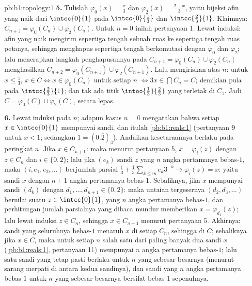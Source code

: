 \begin{solution}{pb:b1:topology:1}
\textbf{5.} Tulislah $\varphi_0(x) = \frac x3$ dan $\varphi_2(x) =
\frac{2 + x}{3}$, yaitu bijeksi afin yang naik dari $\intcc{0}{1}$
pada $\intcc{0}{\frac13}$ dan $\intcc{\frac23}{1}$. Klaimnya:
$C_{n+1} = \varphi_0(C_n) \cup \varphi_2(C_n)$. Untuk $n = 0$ inilah
pertanyaan 1. Lewat induksi:  afin yang naik mengirim
sepertiga tengah sebuah ruas ke sepertiga tengah ruas
petanya, sehingga menghapus sepertiga tengah berkomutasi dengan $\varphi_0$ dan
$\varphi_2$; lalu menerapkan langkah penghapusannya pada $C_{n+1} =
\varphi_0(C_n) \cup \varphi_2(C_n)$ menghasilkan $C_{n+2} =
\varphi_0(C_{n+1}) \cup \varphi_2(C_{n+1})$. Lalu mengiriskan atas
$n$: untuk $x \leq \frac13$, $x \in C \iff x \in \varphi_0(C_n)$
untuk setiap $n$ $\iff 3x \in \bigcap C_n = C$; demikian pula pada
$\intcc{\frac23}{1}$; dan tak ada titik $\intoo{\frac13}{\frac23}$ yang
terletak di $C_1$. Jadi $C = \varphi_0(C) \cup \varphi_2(C)$,
secara lepas.

\textbf{6.} Lewat induksi pada $n$; adapun kasus $n = 0$ mengatakan bahwa setiap $x \in
\intcc{0}{1}$ mempunyai sandi, dan itulah \cref{pb:b1:reals:1}
(pertanyaan 9 untuk $x < 1$; sedangkan $1 = (0.\overline 2)_3$). Andaikan
kesetaraannya berlaku pada peringkat $n$. Jika $x \in C_{n+1}$: maka menurut pertanyaan 5, $x =
\varphi_i(z)$ dengan $z \in C_n$ dan $i \in \{0, 2\}$; lalu jika $(e_k)$
sandi $z$ yang $n$ angka pertamanya bebas-$1$, maka $(i, e_1,
e_2, \dots)$ berjumlah parsial $\frac i3 + \frac13\sum_{k\leq m}
e_k 3^{-k} \to \varphi_i(z) = x$: yaitu sandi $x$ dengan $n +
1$ angka pertamanya bebas-$1$. Sebaliknya, jika $x$ mempunyai sandi $(d_k)$ dengan
$d_1, \dots, d_{n+1} \in \{0, 2\}$: maka untaian tergesernya $(d_2,
d_3, \dots)$ bernilai suatu $z \in \intcc{0}{1}$, yang $n$ angka
pertamanya bebas-$1$, dan perhitungan jumlah parsialnya yang dibaca
mundur memberikan $x = \varphi_{d_1}(z)$; lalu lewat induksi $z \in
C_n$, sehingga $x \in C_{n+1}$ menurut pertanyaan 5. Akhirnya: sandi
yang seluruhnya bebas-$1$ menaruh $x$ di setiap $C_n$, sehingga di $C$; sebaliknya
jika $x \in C$, maka untuk setiap $n$ salah satu dari paling banyak dua sandi
$x$ (\cref{pb:b1:reals:1}, pertanyaan 11) mempunyai $n$ angka pertamanya
bebas-$1$; lalu satu sandi yang tetap pasti berlaku untuk $n$ yang sebesar-besarnya
(menurut sarang merpati di antara kedua sandinya), dan sandi yang $n$ angka
pertamanya bebas-$1$ untuk $n$ yang sebesar-besarnya bersifat bebas-$1$
sepenuhnya.


\end{solution}
